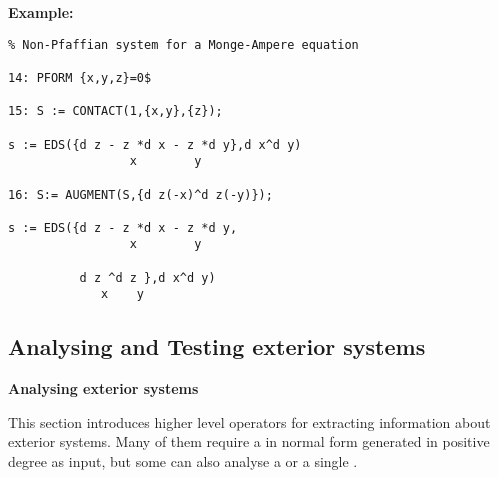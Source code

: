 {\bf Example:}
\begin{verbatim}
% Non-Pfaffian system for a Monge-Ampere equation

14: PFORM {x,y,z}=0$

15: S := CONTACT(1,{x,y},{z});

s := EDS({d z - z *d x - z *d y},d x^d y)
                 x        y

16: S:= AUGMENT(S,{d z(-x)^d z(-y)});

s := EDS({d z - z *d x - z *d y,
                 x        y

          d z ^d z },d x^d y)
             x    y
\end{verbatim}


\subsection{Analysing and Testing exterior systems}

{\bf Analysing exterior systems} \par
This section introduces higher level operators for extracting information about
exterior systems. Many of them require a  in normal form generated
in positive degree as input, but some can also analyse a  or a
single . \\ 

